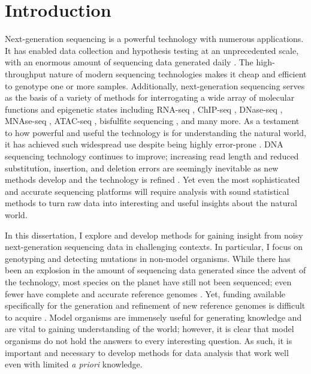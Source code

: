 \chapter{Introduction}



Next-generation sequencing is a powerful technology with numerous applications. It has enabled data collection and hypothesis testing at an unprecedented scale, with an enormous amount of sequencing data generated daily \parencite{kodama_sequence_2012}. The high-throughput nature of modern sequencing technologies makes it cheap and efficient to genotype one or more samples. Additionally, next-generation sequencing serves as the basis of a variety of methods for interrogating a wide array of molecular functions and epigenetic states including RNA-seq \parencite{nagalakshmi_transcriptional_2008}, ChIP-seq \parencite{johnson_genome-wide_2007}, DNase-seq \parencite{boyle_high-resolution_2008}, MNAse-seq \parencite{schones_dynamic_2008}, ATAC-seq \parencite{buenrostro_atac-seq_2015}, bisfulfite sequencing \parencite{frommer_genomic_1992}, and many more. As a testament to how powerful and useful the technology is for understanding the natural world, it has achieved such widespread use despite being highly error-prone \parencite{nakamura_sequence-specific_2011, meacham_identification_2011, fox_accuracy_2014}. DNA sequencing technology continues to improve; increasing read length and reduced substitution, insertion, and deletion errors are seemingly inevitable as new methods develop and the technology is refined \parencite{branton_potential_2008, eid_real-time_2009, fox_accuracy_2014}. Yet even the most sophisticated and accurate sequencing platforms will require analysis with sound statistical methods to turn raw data into interesting and useful insights about the natural world.

In this dissertation, I explore and develop methods for gaining insight from noisy next-generation sequencing data in challenging contexts. In particular, I focus on genotyping and detecting mutations in non-model organisms. While there has been an explosion in the amount of sequencing data generated since the advent of the technology, most species on the planet have still not been sequenced; even fewer have complete and accurate reference genomes \parencite{lewin_earth_2018}. Yet, funding available specifically for the generation and refinement of new reference genomes is difficult to acquire \parencite{richards_its_2015}. Model organisms are immensely useful for generating knowledge and are vital to gaining understanding of the world; however, it is clear that model organisms do not hold the answers to every interesting question. As such, it is important and necessary to develop methods for data analysis that work well even with limited \textit{a priori} knowledge.

